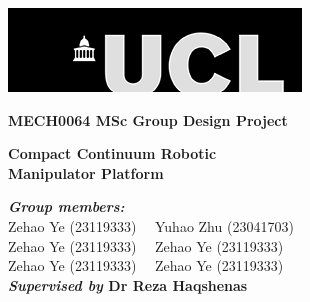 \begin{titlepage}
\begin{center}
        \begin{center}
        \includegraphics[width=.70\textwidth]{Image/ucl_logo.png}
        \vspace{0.5cm}
        \end{center}
        \vspace*{0.1cm}
        \vspace{2cm}
        {\LARGE\textbf{MECH0064 MSc Group Design Project\\}}

        \vspace{2cm}
        {\Huge\textbf{Compact Continuum Robotic\\}}
        \vspace{0.25cm}
        {\Huge\textbf{Manipulator Platform\\}}

        \vfill

        \begin{flushleft}
        \textbf{\emph{Group members:}} \\
        Zehao Ye (23119333)~~ Yuhao Zhu (23041703)\\ 
        Zehao Ye (23119333)~~ Zehao Ye (23119333)\\ 
        Zehao Ye (23119333)~~ Zehao Ye (23119333)\\ 
        \textbf{\emph{Supervised by} Dr Reza Haqshenas}
        \end{flushleft}
        \vspace{0.8cm}
\end{center}
\end{titlepage}

